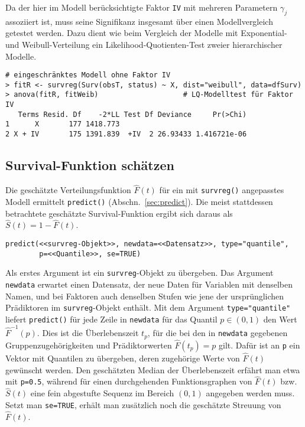 Da der hier im Modell berücksichtigte Faktor \lstinline!IV! mit mehreren Parametern $\gamma_{j}$ assoziiert ist, muss seine Signifikanz insgesamt über einen Modellvergleich getestet werden. Dazu dient wie beim Vergleich der Modelle mit Exponential- und Weibull-Verteilung ein Likelihood-Quotienten-Test zweier hierarchischer Modelle.
\begin{lstlisting}
# eingeschränktes Modell ohne Faktor IV
> fitR <- survreg(Surv(obsT, status) ~ X, dist="weibull", data=dfSurv)
> anova(fitR, fitWeib)                    # LQ-Modelltest für Faktor IV
   Terms Resid. Df    -2*LL Test Df Deviance     Pr(>Chi)
1      X       177 1418.773
2 X + IV       175 1391.839  +IV  2 26.93433 1.416721e-06
\end{lstlisting}

\subsection{Survival-Funktion schätzen}

Die geschätzte Verteilungsfunktion $\hat{F}(t)$ für ein mit \lstinline!survreg()! angepasstes Modell ermittelt \lstinline!predict()! (Abschn.\ \ref{sec:predict}). Die meist stattdessen betrachtete geschätzte Survival-Funktion ergibt sich daraus als $\hat{S}(t) = 1-\hat{F}(t)$.
\begin{lstlisting}
predict(<<survreg-Objekt>>, newdata=<<Datensatz>>, type="quantile",
        p=<<Quantile>>, se=TRUE)
\end{lstlisting}

Als erstes Argument ist ein \lstinline!survreg!-Objekt zu übergeben. Das Argument \lstinline!newdata! erwartet einen Datensatz, der neue Daten für Variablen mit denselben Namen, und bei Faktoren auch denselben Stufen wie jene der ursprünglichen Prädiktoren im \lstinline!survreg!-Objekt enthält. Mit dem Argument \lstinline!type="quantile"! liefert \lstinline!predict()! für jede Zeile in \lstinline!newdata! für das Quantil $p \in (0, 1)$ den Wert $\hat{F}^{-1}(p)$. Dies ist die Überlebenszeit $t_{p}$, für die bei den in \lstinline!newdata! gegebenen Gruppenzugehörigkeiten und Prädiktorwerten $\hat{F}(t_{p}) = p$ gilt. Dafür ist an \lstinline!p! ein Vektor mit Quantilen zu übergeben, deren zugehörige Werte von $\hat{F}(t)$ gewünscht werden. Den geschätzten Median der Überlebenszeit erfährt man etwa mit \lstinline!p=0.5!, während für einen durchgehenden Funktionsgraphen von $\hat{F}(t)$ bzw. $\hat{S}(t)$ eine fein abgestufte Sequenz im Bereich $(0, 1)$ angegeben werden muss. Setzt man \lstinline!se=TRUE!, erhält man zusätzlich noch die geschätzte Streuung von $\hat{F}(t)$.

